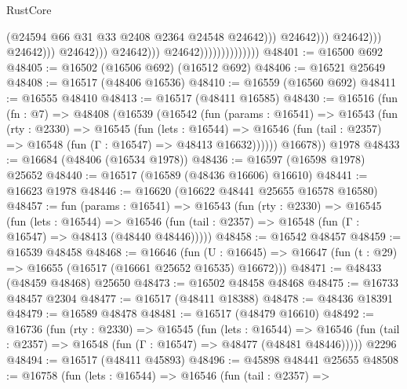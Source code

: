 \begin{lexlean}{RustCore}
\begin{coremodule}
                                                                  (@24594
                                                                    @66
                                                                    @31
                                                                    @33
                                                                    @2408
                                                                    @2364
                                                                    @24548
                                                                    @24642)))
                                                              @24642)))
                                                        @24642)))
                                                  @24642)))
                                            @24642)))
                                      @24642)))
                                @24642))))))))))))))
@48401 := @16500 @692
@48405 := @16502 (@16506 @692) (@16512 @692)
@48406 := @16521 @25649
@48408 := @16517 (@48406 @16536)
@48410 := @16559 (@16560 @692)
@48411 := @16555 @48410
@48413 := @16517 (@48411 @16585)
@48430 := @16516
    (fun (fn : @7) =>
    @48408
      (@16539
        (@16542
          (fun (params : @16541) =>
          @16543
            (fun (rty : @2330) =>
            @16545
              (fun (lets : @16544) =>
              @16546 (fun (tail : @2357) => @16548 (fun (Γ : @16547) => @48413 @16632))))))
        @16678))
    @1978
@48433 := @16684 (@48406 (@16534 @1978))
@48436 := @16597 (@16598 @1978) @25652
@48440 := @16517 (@16589 (@48436 @16606) @16610)
@48441 := @16623 @1978
@48446 := @16620 (@16622 @48441 @25655 @16578 @16580)
@48457 := fun (params : @16541) =>
  @16543
    (fun (rty : @2330) =>
    @16545
      (fun (lets : @16544) =>
      @16546 (fun (tail : @2357) => @16548 (fun (Γ : @16547) => @48413 (@48440 @48446)))))
@48458 := @16542 @48457
@48459 := @16539 @48458
@48468 := @16646
    (fun (U : @16645) => @16647 (fun (t : @29) => @16655 (@16517 (@16661 @25652 @16535) @16672)))
@48471 := @48433 (@48459 @48468) @25650
@48473 := @16502 @48458 @48468
@48475 := @16733 @48457 @2304
@48477 := @16517 (@48411 @18388)
@48478 := @48436 @18391
@48479 := @16589 @48478
@48481 := @16517 (@48479 @16610)
@48492 := @16736
    (fun (rty : @2330) =>
    @16545
      (fun (lets : @16544) =>
      @16546 (fun (tail : @2357) => @16548 (fun (Γ : @16547) => @48477 (@48481 @48446)))))
    @2296
@48494 := @16517 (@48411 @45893)
@48496 := @45898 @48441 @25655
@48508 := @16758
    (fun (lets : @16544) =>
    @16546
      (fun (tail : @2357) =>

\end{coremodule}
\end{lexlean}
